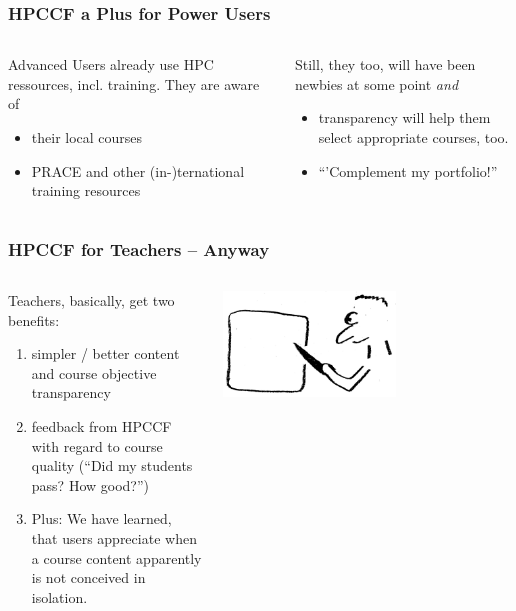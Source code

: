 \begin{frame}
  \frametitle{HPCCF a Plus for Power Users}
  \begin{columns}
    \begin{column}{.5\textwidth}
      Advanced Users already use HPC ressources, incl. training. They are aware of
      \begin{itemize}
       \item their local courses
       \item PRACE and other (in-)ternational training resources
      \end{itemize}
    \end{column}
    \begin{column}{.5\textwidth}
      \pause
      Still, they too, will have been newbies at some point \emph{and}
      \begin{itemize}[<+->]
        \item transparency will help them select appropriate courses, too.
        \item ``'Complement my portfolio!''
      \end{itemize}
    \end{column}
  \end{columns}
\end{frame}

\begin{frame}
  \frametitle{HPCCF for Teachers -- Anyway}
  \begin{columns}
   \begin{column}{.5\textwidth}
    Teachers, basically, get two benefits:
     \begin{enumerate}
      \item simpler / better content and course objective transparency
      \item feedback from HPCCF with regard to course quality (``Did my students pass? How good?'')
      \item Plus: We have learned, that users appreciate when a course content apparently is not conceived in isolation.
     \end{enumerate}
   \end{column}
   \begin{column}{.5\textwidth}
       \centering
      \includegraphics[width=0.6\textwidth]{images/teacher}
    \end{column}
  \end{columns}
\end{frame}


